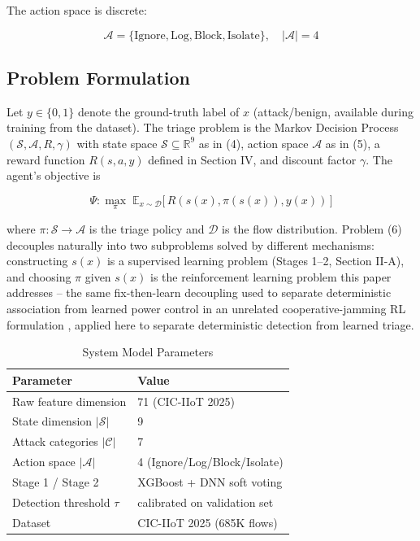 \documentclass[conference]{IEEEtran}
\begin{document}
The action space is discrete:

\begin{equation}
\mathcal{A} = \{\text{Ignore}, \text{Log}, \text{Block}, \text{Isolate}\}, \quad |\mathcal{A}| = 4
\end{equation}

\subsection{Problem Formulation}

Let $y \in \{0,1\}$ denote the ground-truth label of $x$ (attack/benign, available during training from the dataset). The triage problem is the Markov Decision Process $(\mathcal{S}, \mathcal{A}, R, \gamma)$ with state space $\mathcal{S} \subseteq \mathbb{R}^9$ as in (4), action space $\mathcal{A}$ as in (5), a reward function $R(s,a,y)$ defined in Section IV, and discount factor $\gamma$. The agent's objective is

\begin{equation}
\Psi: \max_{\pi} \; \mathbb{E}_{x \sim \mathcal{D}} \big[\, R(s(x), \pi(s(x)), y(x)) \,\big]
\end{equation}

where $\pi: \mathcal{S} \rightarrow \mathcal{A}$ is the triage policy and $\mathcal{D}$ is the flow distribution. Problem (6) decouples naturally into two subproblems solved by different mechanisms: constructing $s(x)$ is a supervised learning problem (Stages 1--2, Section II-A), and choosing $\pi$ given $s(x)$ is the reinforcement learning problem this paper addresses -- the same fix-then-learn decoupling used to separate deterministic association from learned power control in an unrelated cooperative-jamming RL formulation \cite{hoseini}, applied here to separate deterministic detection from learned triage.

\begin{table}[t]
\caption{System Model Parameters}
\centering
\begin{tabular}{|l|l|}
\hline
\textbf{Parameter} & \textbf{Value} \\
\hline
Raw feature dimension & 71 (CIC-IIoT 2025) \\
State dimension $|\mathcal{S}|$ & 9 \\
Attack categories $|\mathcal{C}|$ & 7 \\
Action space $|\mathcal{A}|$ & 4 (Ignore/Log/Block/Isolate) \\
Stage 1 / Stage 2 & XGBoost + DNN soft voting \\
Detection threshold $\tau$ & calibrated on validation set \\
Dataset & CIC-IIoT 2025 (685K flows) \cite{ciciiot2025} \\
\hline
\end{tabular}
\end{table}
\end{document}
